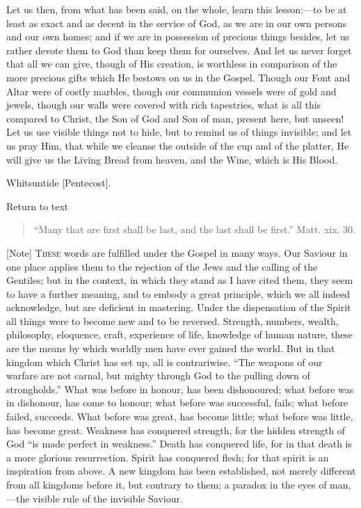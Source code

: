 Let us then, from what has been said, on the whole, learn this
lesson:—to be at least as exact and as decent in the service of God,
as we are in our own persons and our own homes; and if we are in
possession of precious things besides, let us rather devote them to
God than keep them for ourselves. And let us never forget that all we
can give, though of His creation, is worthless in comparison of the
more precious gifts which He bestows on us in the Gospel. Though our
Font and Altar were of costly marbles, though our communion vessels
were of gold and jewels, though our walls were covered with rich
tapestries, what is all this compared to Christ, the Son of God and
Son of man, present here, but unseen! Let us use visible things not to
hide, but to remind us of things invisible; and let us pray Him, that
while we cleanse the outside of the cup and of the platter, He will
give us the Living Bread from heaven, and the Wine, which is His
Blood.


Whitsuntide [Pentecost].

Return to text


\begin{quote}

``Many that are first shall be last, and the
last shall be first.'' Matt. xix. 30.

\end{quote}

[Note] T\textsc{hese} words are fulfilled
under the Gospel in many ways. Our Saviour in one place applies them
to the rejection of the Jews and the calling of the Gentiles; but in
the context, in which they stand as I have cited them, they seem to
have a further meaning, and to embody a great principle, which we all
indeed acknowledge, but are deficient in mastering. Under the
dispensation of the Spirit all things were to become new and to be
reversed. Strength, numbers, wealth, philosophy, eloquence, craft,
experience of life, knowledge of human nature, these are the means by
which worldly men have ever gained the world. But in that kingdom
which Christ has set up, all is contrariwise. ``The weapons of our
warfare are not carnal, but mighty through God to the pulling down of
strongholds.'' What was before in honour, has been dishonoured;
what before was in dishonour, has come to honour; what before was
successful, fails; what before failed, succeeds. What before was
great, has become little; what before was little, has become great.
Weakness has conquered strength, for the hidden strength of God
``is made perfect in weakness.'' Death has conquered life, for
in that death is a more glorious resurrection. Spirit has conquered
flesh; for that spirit is an inspiration from above. A new kingdom has
been established, not merely different from all kingdoms before it,
but contrary to them; a paradox in the eyes of man,—the visible rule
of the invisible Saviour.

